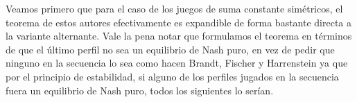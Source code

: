 

Veamos primero que para el caso de los juegos de suma constante simétricos, el teorema de estos autores efectivamente es expandible de forma bastante directa a la variante alternante. Vale la pena notar que formulamos el teorema en términos de que el último perfil no sea un equilibrio de Nash puro, en vez de pedir que ninguno en la secuencia lo sea como hacen Brandt, Fischer y Harrenstein ya que por el principio de estabilidad, si alguno de los perfiles jugados en la secuencia fuera un equilibrio de Nash puro, todos los siguientes lo serían.

